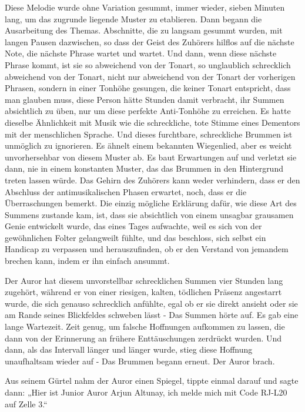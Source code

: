 {Diese Melodie wurde ohne Variation gesummt, immer wieder, sieben Minuten lang, um das zugrunde liegende Muster zu etablieren. Dann begann die Ausarbeitung des Themas. Abschnitte, die zu langsam gesummt wurden, mit langen Pausen dazwischen, so dass der Geist des Zuhörers hilflos auf die nächste Note, die nächste Phrase wartet und wartet. Und dann, wenn diese nächste Phrase kommt, ist sie so abweichend von der Tonart, so unglaublich schrecklich abweichend von der Tonart, nicht nur abweichend von der Tonart der vorherigen Phrasen, sondern in einer Tonhöhe gesungen, die keiner Tonart entspricht, dass man glauben muss, diese Person hätte Stunden damit verbracht, ihr Summen absichtlich zu üben, nur um diese perfekte Anti-Tonhöhe zu erreichen. Es hatte dieselbe Ähnlichkeit mit Musik wie die schreckliche, tote Stimme eines Dementors mit der menschlichen Sprache. Und dieses furchtbare, schreckliche Brummen ist unmöglich zu ignorieren. Es ähnelt einem bekannten Wiegenlied, aber es weicht unvorhersehbar von diesem Muster ab. Es baut Erwartungen auf und verletzt sie dann, nie in einem konstanten Muster, das das Brummen in den Hintergrund treten lassen würde. Das Gehirn des Zuhörers kann weder verhindern, dass er den Abschluss der antimusikalischen Phasen erwartet, noch, dass er die Überraschungen bemerkt. Die einzig mögliche Erklärung dafür, wie diese Art des Summens zustande kam, ist, dass sie absichtlich von einem unsagbar grausamen Genie entwickelt wurde, das eines Tages aufwachte, weil es sich von der gewöhnlichen Folter gelangweilt fühlte, und das beschloss, sich selbst ein Handicap zu verpassen und herauszufinden, ob er den Verstand von jemandem brechen kann, indem er ihn einfach ansummt.

Der Auror hat diesem unvorstellbar schrecklichen Summen vier Stunden lang zugehört, während er von einer riesigen, kalten, tödlichen Präsenz angestarrt wurde, die sich genauso schrecklich anfühlte, egal ob er sie direkt ansieht oder sie am Rande seines Blickfeldes schweben lässt - Das Summen hörte auf. Es gab eine lange Wartezeit. Zeit genug, um falsche Hoffnungen aufkommen zu lassen, die dann von der Erinnerung an frühere Enttäuschungen zerdrückt wurden. Und dann, als das Intervall länger und länger wurde, stieg diese Hoffnung unaufhaltsam wieder auf - Das Brummen begann erneut. Der Auror brach.

Aus seinem Gürtel nahm der Auror einen Spiegel, tippte einmal darauf und sagte dann: „Hier ist Junior Auror Arjun Altunay, ich melde mich mit Code RJ-L20 auf Zelle 3.“

}
